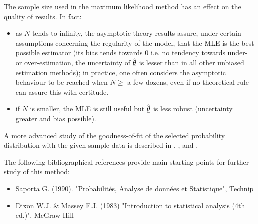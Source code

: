 {
  The sample size used in the maximum likelihood method has an effect on the quality of results. In fact:

  \begin{itemize}
  \item as $N$ tends to infinity, the asymptotic theory results assure, under certain assumptions concerning the regularity of the model, that the MLE is the best possible estimator (its bias tends towards 0 i.e. no tendency towards under- or over-estimation, the uncertainty of  $\hat{{\underline{\theta}}}$ is lesser than in all other unbiased estimation methods); in practice, one often considers the asymptotic behaviour to be reached when $N \geq$ a few dozens, even if no theoretical rule can assure this with certitude.
  \item if $N$ is smaller, the MLE is still useful but $\hat{{\underline{\theta}}}$ is less robust (uncertainty greater and bias possible).
  \end{itemize}

  A more advanced study of the goodness-of-fit of the selected probability distribution with the given sample data is described in  , ,  and .

  The following bibliographical references provide main starting points for further study of  this method:
  \begin{itemize}
  \item Saporta G. (1990). "Probabilités, Analyse de données et Statistique", Technip
  \item Dixon W.J. \& Massey F.J. (1983) "Introduction to statistical analysis (4th ed.)", McGraw-Hill
  \end{itemize}
}
